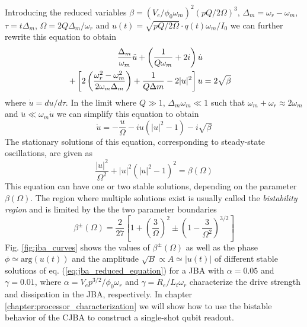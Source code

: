Introducing the reduced variables $\beta = (V_e/\phi_0 \omega_m)^2(pQ/2\Omega)^3$, $\Delta_m = \omega_r-\omega_m$, $\tau = t\Delta_m$, $\Omega=2Q\Delta_m/\omega_r$ and $u(t) = \sqrt{pQ/2\Omega}\cdot q(t)\omega_m/I_0$ we can further rewrite this equation to obtain
%
\begin{align}
\frac{\Delta_m}{\omega_m}\ddot{u}+\left(\frac{1}{Q \omega_m}+2i\right)\dot{u} \notag \\
 + \left[ 2\left(\frac{\omega_r^2-\omega_m^2}{2\omega_m \Delta_m}\right)+\frac{1}{Q\Delta m}-2|u|^2\right]u & =  2\sqrt{\beta} \label{eq:jba_theory_1}
\end{align}
%
where $\dot{u}=du/d\tau$. In the limit where $Q \gg 1$, $\Delta_m\omega_m \ll 1$ such that $\omega_m+\omega_r \approx 2\omega_m$ and $\ddot{u}\ll\omega_m \dot{u}$ we can simplify this equation to obtain
%
\begin{equation}
\dot{u} = -\frac{u}{\Omega}-iu\left(|u|^2-1\right)-i\sqrt{\beta} \label{eq:jba_reduced_equation}
\end{equation}
%
The stationary solutions of this equation, corresponding to steady-state oscillations, are given as
%
\begin{equation}
\frac{|u|^2}{\Omega^2}+|u|^2\left(|u|^2-1\right)^2 = \beta(\Omega)
\end{equation}
%
This equation can have one or two stable solutions, depending on the parameter $\beta(\Omega)$. The region where multiple solutions exist is usually called the {\it bistability region} and is limited by the the two parameter boundaries
%
\begin{equation}
\beta^\pm(\Omega) = \frac{2}{27}\left[1+\left(\frac{3}{\Omega}\right)^2\pm\left(1-\frac{3}{\Omega^2}\right)^{3/2}\right] \label{eq:jba_beta}
\end{equation}
%
Fig. \ref{fig:jba_curves} shows the values of $\beta^\pm(\Omega)$ as well as the phase $\phi\simeq \mathrm{arg}(u(t))$ and the amplitude $\sqrt{B}\propto A \simeq |u(t)|$ of different stable solutions of eq. (\ref{eq:jba_reduced_equation}) for a JBA with $\alpha=0.05$ and $\gamma=0.01$, where $\alpha=V_ep^{3/2}/\phi_0 \omega_r$ and $\gamma = R_e/L_t\omega_r$ characterize the drive strength and dissipation in the JBA, respectively. In chapter \ref{chapter:processor_characterization} we will show how to use the bistable behavior of the CJBA to construct a single-shot qubit readout.

